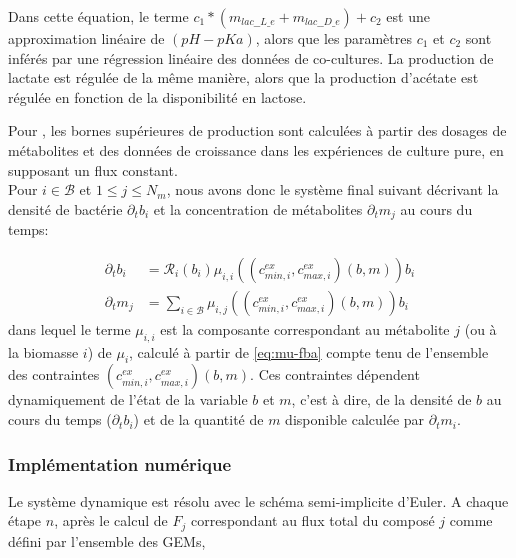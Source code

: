 Dans cette équation, le terme $c_1 * (m_{lac\_\_L\_e}+m_{lac\_\_D\_e})+c_2$ est une approximation linéaire de $(pH-pKa)$, alors que les paramètres 
$c_1$ et $c_2$ sont inférés par une régression linéaire des données de co-cultures. La production de lactate est régulée de la même manière, alors que la production d'acétate est régulée en fonction de la disponibilité en lactose. 

Pour \freud, les bornes supérieures de production sont calculées à partir des dosages de métabolites et des données de croissance dans les expériences de culture pure, en supposant un flux constant.\\

Pour $i\in \mathcal{B}$ et $1\leq j \leq N_m$, nous avons donc le système final suivant décrivant la densité de bactérie $\partial_t b_i$ et la concentration de métabolites $\partial_t m_j$ au cours du temps:

\begin{align}
    \label{eq:system_dynamics_b}
    \partial_t b_i& = \mathcal{R}_{i}(b_i) {\mu}_{i,i}\left((c^{ex}_{min,i},c^{ex}_{max,i})(b,m)\right) b_i  \\
    \label{eq:system_dynamics_m}
    \partial_t m_j &= \sum_{i \in \mathcal{B}} {\mu}_{i,j}\left((c^{ex}_{min,i},c^{ex}_{max,i})(b,m)\right) b_i 
\end{align}
dans lequel le terme ${\mu}_{i,i}$ est la composante correspondant au métabolite $j$ (ou à la biomasse $i$) de $\mu_i$, calculé à partir de \ref{eq:mu-fba} compte tenu de l'ensemble des contraintes $(c^{ex}_{min,i},c^{ex}_{max,i})(b,m)$. Ces contraintes dépendent dynamiquement de l'état de la variable $b$ et $m$, c'est à dire, de la densité de $b$ au cours du temps ($\partial_t b_i$) et de la quantité de $m$ disponible calculée par $\partial_t m_i$. 





\subsubsection*{Implémentation numérique} 
Le système dynamique est résolu avec le schéma semi-implicite d'Euler. A chaque étape $n$, après le calcul de $F_j$ correspondant au flux total du composé $j$ comme défini par l'ensemble des GEMs, 

